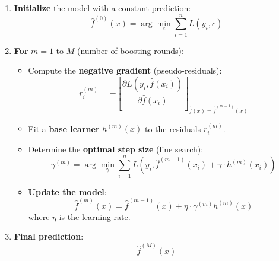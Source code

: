 \documentclass[
  letterpaper,
  DIV=11,
  numbers=noendperiod]{scrreprt}
\begin{document}
\begin{enumerate}
\def\labelenumi{\arabic{enumi}.}
\item
  \textbf{Initialize} the model with a constant prediction:\\
  \[
  \hat{f}^{(0)}(x) = \arg\min_c \sum_{i=1}^n L(y_i, c)
  \]
\item
  \textbf{For} \(m = 1\) to \(M\) (number of boosting rounds):

  \begin{itemize}
  \item
    Compute the \textbf{negative gradient} (pseudo-residuals):\\
    \[
    r_i^{(m)} = - \left[ \frac{\partial L(y_i, \hat{f}(x_i))}{\partial \hat{f}(x_i)} \right]_{\hat{f}(x) = \hat{f}^{(m-1)}(x)}
    \]
  \item
    Fit a \textbf{base learner} \(h^{(m)}(x)\) to the residuals
    \(r_i^{(m)}\).
  \item
    Determine the \textbf{optimal step size} (line search):\\
    \[
    \gamma^{(m)} = \arg\min_\gamma \sum_{i=1}^n L\left(y_i, \hat{f}^{(m-1)}(x_i) + \gamma \cdot h^{(m)}(x_i)\right)
    \]
  \item
    \textbf{Update the model}:\\
    \[
    \hat{f}^{(m)}(x) = \hat{f}^{(m-1)}(x) + \eta \cdot \gamma^{(m)} h^{(m)}(x)
    \] where \(\eta\) is the learning rate.
  \end{itemize}
\item
  \textbf{Final prediction}:\\
  \[
  \hat{f}^{(M)}(x)
  \]
\end{enumerate}
\end{document}

